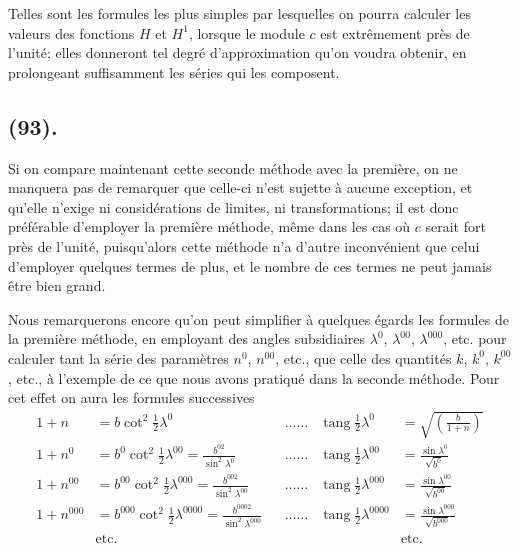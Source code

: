\documentclass{article}
\begin{document}
Telles sont les formules les plus simples par lesquelles on pourra calculer les valeurs des fonctions $H$ et $H^{1}$, lorsque le module $c$ est extrêmement près de l'unité; elles donneront tel degré d'approximation qu'on voudra obtenir, en prolongeant suffisamment les séries qui les composent.

\subsection*{(93).}

Si on compare maintenant cette seconde méthode avec la première, on ne manquera pas de remarquer que celle-ci n'est sujette à aucune exception, et qu'elle n'exige ni considérations de limites, ni transformations; il est donc préférable d'employer la première méthode, même dans les cas où $c$ serait fort près de l'unité, puisqu'alors cette méthode n'a d'autre inconvénient que celui d'employer quelques termes de plus, et le nombre de ces termes ne peut jamais être bien grand.

Nous remarquerons encore qu'on peut simplifier à quelques égards les formules de la première méthode, en employant des angles subsidiaires $\lambda^{0}$, $\lambda^{00}$, $\lambda^{000}$, etc. pour calculer tant la série des paramètres $n^{0}$, $n^{00}$, etc., que celle des quantités $k$, $k^{0}$, $k^{00}$, etc., à l'exemple de ce que nous avons pratiqué dans la seconde méthode. Pour cet effet on aura les formules successives
\[ \begin{aligned} 1+n&=b\cot^{2}\tfrac{1}{2}\lambda^{0} &&\ldots\ldots &\operatorname{tang}\tfrac{1}{2}\lambda^{0}&=\sqrt{\left(\frac{b}{1+n}\right)}\\ 1+n^{0}&=b^{0}\cot^{2}\tfrac{1}{2}\lambda^{00}=\frac{b^{02}}{\sin^{2}\lambda^{0}} &&\ldots\ldots &\operatorname{tang}\tfrac{1}{2}\lambda^{00}&=\frac{\sin\lambda^{0}}{\sqrt{b^{0}}}\\ 1+n^{00}&=b^{00}\cot^{2}\tfrac{1}{2}\lambda^{000}=\frac{b^{002}}{\sin^{2}\lambda^{00}} &&\ldots\ldots &\operatorname{tang}\tfrac{1}{2}\lambda^{000}&=\frac{\sin\lambda^{00}}{\sqrt{b^{00}}}\\ 1+n^{000}&=b^{000}\cot^{2}\tfrac{1}{2}\lambda^{0000}=\frac{b^{0002}}{\sin^{2}\lambda^{000}} &&\ldots\ldots &\operatorname{tang}\tfrac{1}{2}\lambda^{0000}&=\frac{\sin\lambda^{000}}{\sqrt{b^{000}}}\\ &\text{etc.} &&& &\text{etc.} \end{aligned} \]
\end{document}
